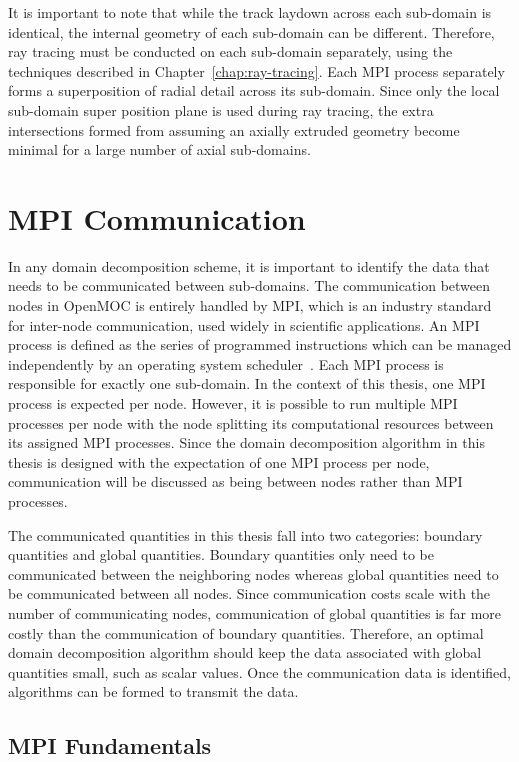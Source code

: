 It is important to note that while the track laydown across each sub-domain is identical, the internal geometry of each sub-domain can be different. Therefore, ray tracing must be conducted on each sub-domain separately, using the techniques described in Chapter~\ref{chap:ray-tracing}. Each \ac{MPI} process separately forms a superposition of radial detail across its sub-domain. Since only the local sub-domain super position plane is used during ray tracing, the extra intersections formed from assuming an axially extruded geometry become minimal for a large number of axial sub-domains.

\section{MPI Communication}
\label{sec:mpi}

In any domain decomposition scheme, it is important to identify the data that needs to be communicated between sub-domains. The communication between nodes in OpenMOC is entirely handled by \ac{MPI}, which is an industry standard for inter-node communication, used widely in scientific applications. An \ac{MPI} process is defined as the series of programmed instructions which can be managed independently by an operating system scheduler~\cite{lamport}. Each \ac{MPI} process is responsible for exactly one sub-domain. In the context of this thesis, one \ac{MPI} process is expected per node. However, it is possible to run multiple \ac{MPI} processes per node with the node splitting its computational resources between its assigned \ac{MPI} processes. Since the domain decomposition algorithm in this thesis is designed with the expectation of one \ac{MPI} process per node, communication will be discussed as being between nodes rather than \ac{MPI} processes.

The communicated quantities in this thesis fall into two categories: boundary quantities and global quantities. Boundary quantities only need to be communicated between the neighboring nodes whereas global quantities need to be communicated between all nodes. Since communication costs scale with the number of communicating nodes, communication of global quantities is far more costly than the communication of boundary quantities. Therefore, an optimal domain decomposition algorithm should keep the data associated with global quantities small, such as scalar values. Once the communication data is identified, algorithms can be formed to transmit the data. 

\subsection{MPI Fundamentals}

